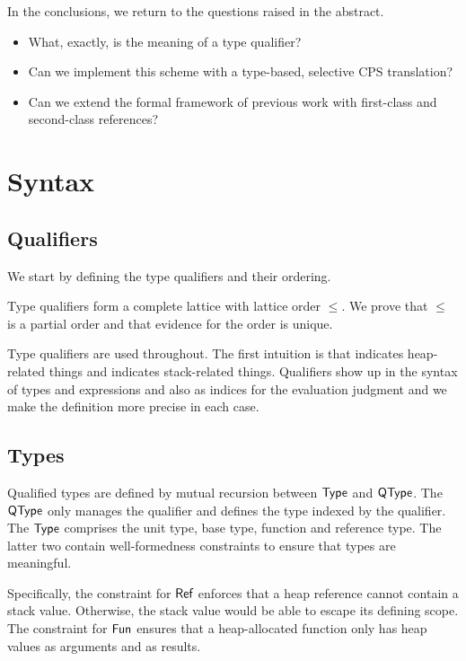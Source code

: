 \documentclass[sigplan,review,dvipsnames,screen,10pt]{acmart}
\begin{document}
In the conclusions, we return to the questions raised in the abstract.
\begin{itemize}
\item What, exactly, is the meaning of a type qualifier?  
\item Can we implement this scheme with a type-based, selective CPS
  translation?
\item Can we extend the formal framework of previous work
  with first-class and second-class references?
\end{itemize}

\section{Syntax}
\label{sec:syntax}

\subsection{Qualifiers}
\label{sec:qualifiers}


We start by defining the type qualifiers  and their ordering.
\Qual

Type qualifiers form a complete lattice with lattice order $\le$. We
prove that $\le$ is a partial order and that evidence for the order is unique.

Type qualifiers are used throughout. The first intuition is that
{\AOne} indicates heap-related things and {\ATwo} indicates
stack-related things.  Qualifiers show up in the syntax of
types and expressions and also as indices for the evaluation
judgment and we make the definition more precise in each case.

\subsection{Types}
\label{sec:types}



Qualified types are defined by mutual recursion between $\AType$ and
$\AQType$.
\QType
The $\AQType$ only manages the qualifier and defines the type indexed
by the qualifier. The $\AType$ comprises the unit type, base type,
function and reference type. The latter two contain well-formedness
constraints to ensure that types are meaningful.

Specifically, the constraint for $\ACRef$ enforces that a heap
reference cannot contain a stack value. Otherwise, the stack value
would be able to escape its defining scope.
The constraint for $\ACFun$ ensures that a heap-allocated function
only has heap values as arguments and as results.
\end{document}
